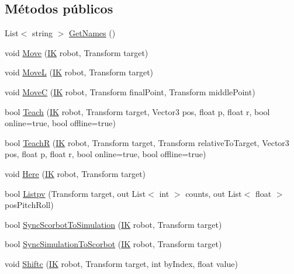 \subsection*{Métodos públicos}
\begin{DoxyCompactItemize}
\item 
List$<$ string $>$ \mbox{\hyperlink{class_command_control_abb616afbdc86f4877b19b951982b6544}{Get\+Names}} ()
\item 
void \mbox{\hyperlink{class_command_control_a57aac28ce1f8ad74a4c2b69a24db8d79}{Move}} (\mbox{\hyperlink{class_i_k}{IK}} robot, Transform target)
\item 
void \mbox{\hyperlink{class_command_control_ab0c2d7d4d5b0ec2329f3bf945af1cbc0}{MoveL}} (\mbox{\hyperlink{class_i_k}{IK}} robot, Transform target)
\item 
void \mbox{\hyperlink{class_command_control_a55788d3a11dcdb25426d84e3b7c75450}{MoveC}} (\mbox{\hyperlink{class_i_k}{IK}} robot, Transform final\+Point, Transform middle\+Point)
\item 
bool \mbox{\hyperlink{class_command_control_afa86230800735c59b15295e22301dafc}{Teach}} (\mbox{\hyperlink{class_i_k}{IK}} robot, Transform target, Vector3 pos, float p, float r, bool online=true, bool offline=true)
\item 
bool \mbox{\hyperlink{class_command_control_a4d8e79d3673b241b55b5e9557810ba05}{TeachR}} (\mbox{\hyperlink{class_i_k}{IK}} robot, Transform target, Transform relative\+To\+Target, Vector3 pos, float p, float r, bool online=true, bool offline=true)
\item 
void \mbox{\hyperlink{class_command_control_a9915c709ac0920b97e9ef9fb01d7cb8b}{Here}} (\mbox{\hyperlink{class_i_k}{IK}} robot, Transform target)
\item 
bool \mbox{\hyperlink{class_command_control_a150fcea4451c4cb929c0b0e2385c2698}{Listpv}} (Transform target, out List$<$ int $>$ counts, out List$<$ float $>$ pos\+Pitch\+Roll)
\item 
bool \mbox{\hyperlink{class_command_control_a69ae96214c4e9cd5f8d3ded57cfe9ba3}{Sync\+Scorbot\+To\+Simulation}} (\mbox{\hyperlink{class_i_k}{IK}} robot, Transform target)
\item 
bool \mbox{\hyperlink{class_command_control_aaa99e27c42b07a387f90af03540ba601}{Sync\+Simulation\+To\+Scorbot}} (\mbox{\hyperlink{class_i_k}{IK}} robot, Transform target)
\item 
void \mbox{\hyperlink{class_command_control_a2de00fee85f608fefc888d987f889af4}{Shiftc}} (\mbox{\hyperlink{class_i_k}{IK}} robot, Transform target, int by\+Index, float value)

\end{DoxyCompactItemize}
